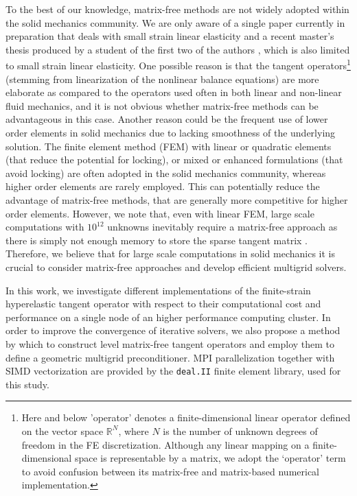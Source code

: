 \documentclass[times,doublespace]{nmeauth}
\begin{document}
To the best of our knowledge, matrix-free methods are not widely adopted within the solid mechanics community.
We are only aware of a single paper currently in preparation that deals with small strain linear elasticity \cite{Clevenger2018} and a recent master's thesis produced by a student of the first two of the authors \cite{Mentler2017},
{\color{red} which is also limited to small strain linear elasticity.}
One possible reason is that the tangent operators\footnote{Here and
below 'operator' denotes a finite-dimensional linear operator defined on the vector space $\mathbb R^N$, where $N$ is the number of unknown degrees of freedom in the FE discretization.
Although any linear mapping on a finite-dimensional space is representable by a matrix, we adopt the `operator' term to avoid confusion between its matrix-free and matrix-based numerical implementation.
} (stemming from linearization of the nonlinear balance equations) are
more elaborate as compared to the operators used often in both linear and non-linear fluid mechanics, and it is not obvious whether matrix-free methods can be advantageous in this case.
Another reason could be the frequent use of lower order elements in solid mechanics due to lacking smoothness of the underlying solution.
The finite element method (FEM) with linear or quadratic elements (that reduce the potential for locking), or mixed or enhanced formulations (that avoid locking) are often adopted in the solid mechanics community,
whereas higher order elements are rarely employed.
This can potentially reduce the advantage of matrix-free methods, that are generally more competitive for higher order elements.
However, we note that, even with linear FEM, large scale computations with $10^{12}$ unknowns inevitably require a matrix-free approach as there is simply not enough memory to store the sparse tangent matrix \cite{Gmeiner2016}. Therefore, we believe that for large scale computations in solid mechanics it is crucial to consider matrix-free approaches and develop efficient multigrid solvers.

In this work, we investigate different implementations of the finite-strain hyperelastic tangent operator with respect to their computational cost
and performance {\color{red} on a single node of an higher performance computing cluster.}
In order to improve the convergence of iterative solvers, we also propose a method by which to construct level matrix-free tangent operators
and employ them to define a \mbox{geometric} multigrid preconditioner.
MPI parallelization together with SIMD vectorization
{\color{red}
are provided by the \texttt{deal.II} \cite{dealII90} finite element library, used for this study.
}
\end{document}
